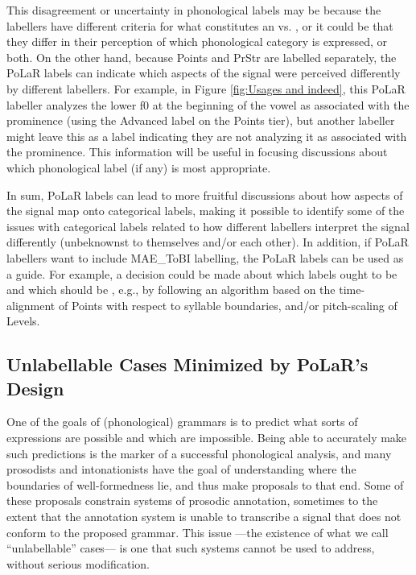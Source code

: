 This disagreement or uncertainty in phonological labels may be because the labellers have different criteria for what constitutes an  vs. , or it could be that they differ in their perception of which phonological category is expressed, or both. On the other hand, because Points and PrStr are labelled separately, the PoLaR labels can indicate which aspects of the signal were perceived differently by different labellers. For example, in Figure \ref{fig:Usages and indeed}, this PoLaR labeller analyzes the lower f0 at the beginning of the vowel as associated with the prominence (using the Advanced \textlabel{*>} label on the Points tier), but another labeller might leave this as a  label indicating they are not analyzing it as associated with the prominence. This information will be useful in focusing discussions about which phonological label (if any) is most appropriate.

In sum, PoLaR labels can lead to more fruitful discussions about how aspects of the signal map onto categorical labels, making it possible to identify some of the issues with categorical labels related to how different labellers interpret the signal differently (unbeknownst to themselves and/or each other). In addition, if PoLaR labellers want to include MAE\_ToBI labelling, the PoLaR labels can be used as a guide.  For example, a decision could be made about which labels ought to be  and which should be , e.g., by following an algorithm based on the time-alignment of Points with respect to syllable boundaries, and/or pitch-scaling of Levels.


\subsection{Unlabellable Cases Minimized by PoLaR’s Design}\label{sec:difficultunlabellable-cases}
One of the goals of (phonological) grammars is to predict what sorts of expressions are possible and which are impossible. Being able to accurately make such predictions is the marker of a successful phonological analysis, and many prosodists and intonationists have the goal of understanding where the boundaries of well-formedness lie, and thus make proposals to that end. Some of these proposals constrain systems of prosodic annotation, sometimes to the extent that the annotation system is unable to transcribe a signal that does not conform to the proposed grammar. This issue —the existence of what we call “unlabellable” cases— is one that such systems cannot be used to address, without serious modification.

